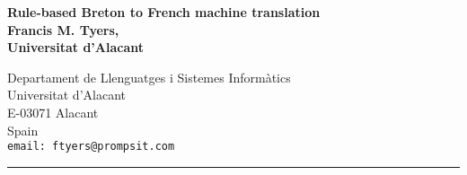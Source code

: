 \documentclass[a0,landscape]{a0poster}
\begin{document}

\begin{minipage}[b]{0.65\linewidth} 
\veryHuge \bf 
\textsf{Rule-based Breton to French machine translation}
\\[1cm]
\huge \bf Francis M. Tyers,\\
\huge \rm Universitat d'Alacant
\end{minipage}
\begin{minipage}[b]{0.35\linewidth} 
\Large Departament de Llenguatges i Sistemes Inform\`{a}tics\\
Universitat d'Alacant\\
E-03071 Alacant\\
Spain\\
\tt{email: ftyers@prompsit.com}
\end{minipage}
\vspace{0.3cm}
\hrule
\vspace{0.3cm}
%
\end{document}
